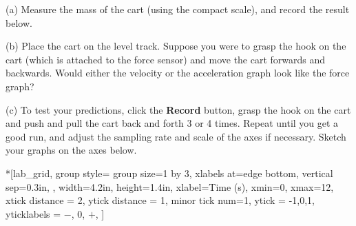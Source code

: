 (a) Measure the mass of the cart (using the compact scale), and record the result below.

\answerspace{10mm}

(b) Place the cart on the level track.  Suppose you were to grasp the hook on the cart (which is attached to the force sensor) and move the cart forwards and backwards. Would either the
velocity or the acceleration graph look like the force graph?



\answerspace{20mm}
\pagebreak[3]
(c) To test your predictions, click the \textbf{Record} button, grasp the
hook on the cart and push and pull the cart back and forth 3 or 4 times. Repeat until you get a good run, and adjust the sampling rate and scale of the axes if necessary. Sketch your graphs on the axes below.


\begin{lab_groupplot}*{}[lab_grid,
	group style={
		group size=1 by 3,
		xlabels at=edge bottom,
		vertical sep=0.3in,
		},
	width=4.2in,  height=1.4in,
	xlabel=Time (s),
	xmin=0, xmax=12,
	xtick distance = 2, 
	ytick distance = 1, 
	minor tick num=1,
	ytick = {-1,0,1},
	yticklabels = {$-$, 0, $+$},
	]
\nextgroupplot[
	ymin=-1,ymax=1, 
	ylabel={Velocity (m/s)},
	]
\nextgroupplot[
	ymin=-1,ymax=1, 
	ylabel={Acceleration (m/s$^2$)},
	]
\nextgroupplot[
	ymin=-1,ymax=1, 
	ylabel={Force (N)},
	]
\end{lab_groupplot}

